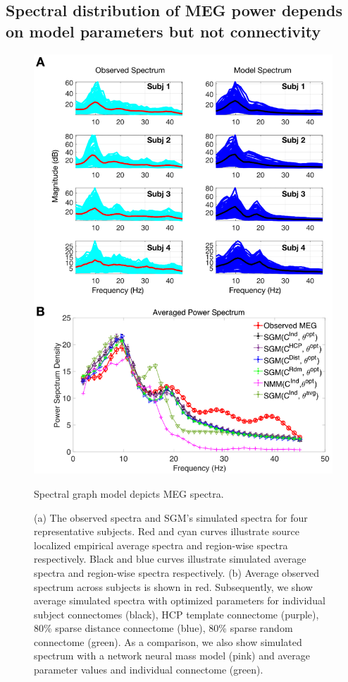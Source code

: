 \subsection{Spectral distribution of MEG power depends on model parameters but not
connectivity}

\begin{figure}[htbp]
    \centering
    \includegraphics[scale=0.85]{../figures/chapter5/fig3_spectra_fit.png}
    \caption{Spectral graph model depicts MEG spectra.}
    \caption*{(a) The observed spectra and SGM's simulated spectra for four representative subjects. Red and cyan curves illustrate source localized empirical average spectra and region-wise spectra respectively. Black and blue curves illustrate simulated average spectra and region-wise spectra respectively. (b) Average observed spectrum across subjects is shown in red. Subsequently, we show average simulated spectra with optimized parameters for individual subject connectomes (black), HCP template connectome (purple), 80\% sparse distance connectome (blue), 80\% sparse random connectome (green). As a comparison, we also show simulated spectrum with a network neural mass model (pink) and average parameter values and individual connectome (green).}
    \label{fig:spectra_fit}
\end{figure}

